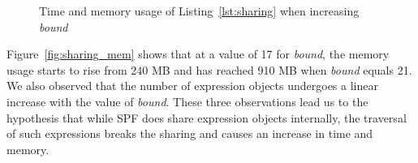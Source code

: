 \begin{figure}%
    \centering
    \qquad
    \caption{Time and memory usage of Listing~\ref{lst:sharing} when increasing \textit{bound}}%
    \label{fig:sharing}%
    \vspace{-0.2in}
\end{figure}
%
Figure~\ref{fig:sharing_mem} shows that at a value of 17 for \textit{bound}, the memory usage starts to rise from 240 MB and has reached 910 MB when \textit{bound} equals 21.
%
We also observed that the number of expression objects undergoes a linear increase with the value of \textit{bound}.
%
These three observations lead us to the hypothesis that while SPF does share expression objects internally, the traversal of such expressions breaks the sharing and causes an increase in time and memory.
%
%
%
